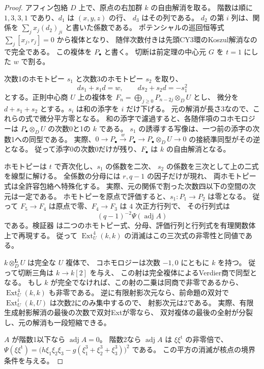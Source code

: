 \begin{proof}
アフィン包絡 $D$ 上で、原点の右加群 $k$ の自由解消を取る。
階数は順に $1,3,3,1$ であり、$d_1$ は $(x,y,z)$ の行、
$d_3$ はその列である。
$d_2$ の第 $i$ 列は、関係を $\sum_j x_j(d_2)_{ji}$ と書いた係数である。
ポテンシャルの巡回恒等式 $\sum_j [x_j,r_j]=0$ から複体となり、
随伴次数付きは先頭CY3環のKoszul解消なので完全である。
この複体を $P_\bullet$ と書く。
切断は前定理の中心元 $G$ を $t=1$ にした $w$ で割る。

次数1のホモトピー $s_1$ と次数3のホモトピー $s_2$ を取り、
\[
 ds_1+s_1d=w,\qquad ds_2+s_2d=-s_1^2
\]
とする。正則中心商 $U$ 上の複体を
$F_n=\bigoplus_{j\ge0}P_{n-2j}\otimes_D U$ とし、
微分を $d+s_1+s_2$ とする。$s_i$ は和の添字を $i$ だけ下げる。
元の解消が長さ3なので、これらの式で微分平方零となる。
和の添字で濾過すると、各随伴項のコホモロジーは
$P_\bullet\otimes_D U$ の次数0と1の $k$ である。
$s_1$ の誘導する写像は、一つ前の添字の次数1への同型である。
実際、$0\to P_\bullet\xrightarrow{w}P_\bullet\to
P_\bullet\otimes_D U\to0$ の接続準同型がその逆となる。
従って添字0の次数0だけが残り、$F_\bullet$ は $k$ の自由解消となる。

ホモトピーは $t$ で斉次化し、$s_1$ の係数を二次、
$s_2$ の係数を三次として上の二式を線型に解ける。
全係数の分母には $r,q-1$ の因子だけが現れ、
両ホモトピー式は全許容包絡へ特殊化する。
実際、元の関係で割った次数四以下の空間の次元は一定である。
ホモトピーを原点で評価すると、$s_1:P_1\to P_2$ は零となる。
従って $F_5\to F_4$ は原点で零、$F_4\to F_3$ は $4$ 次正方行列で、
その行列式は
\[
 (q-1)^{-2}\Psi(\operatorname{adj} A)
\]
である。検証器
は二つのホモトピー式、分母、評価行列と行列式を有理関数体上で再現する。
従って $\operatorname{Ext}^4_U(k,k)$ の消滅はこの三次式の非零性と同値である。

$k\otimes_D^{\mathbf L}U$ は完全な $U$ 複体で、
コホモロジーは次数 $-1,0$ にともに $k$ を持つ。
従って切断三角は $k\to k[2]$ を与え、
この射は完全複体によるVerdier商で同型となる。
もし $k$ が完全でなければ、この射の二乗は同商で非零であるから、
$\operatorname{Ext}^4_U(k,k)$ も非零である。
逆に有限射影次元なら、前命題の双対で
$\operatorname{Ext}_U^i(k,U)$ は次数2にのみ集中するので、
射影次元は2である。
実際、有限生成射影解消の最後の次数で双対Extが零なら、
双対複体の最後の全射が分裂し、元の解消も一段短縮できる。

$A$ が階数1以下なら $\operatorname{adj} A=0$。
階数2なら $\operatorname{adj} A$ は $\xi\xi^{\mathrm t}$ の非零倍で、
$\Psi(\xi\xi^{\mathrm t})=
\bigl(h\xi_1\xi_2\xi_3-g(\xi_1^3+\xi_2^3+\xi_3^3)\bigr)^2$ である。
この平方の消滅が核点の境界条件を与える。
\end{proof}


